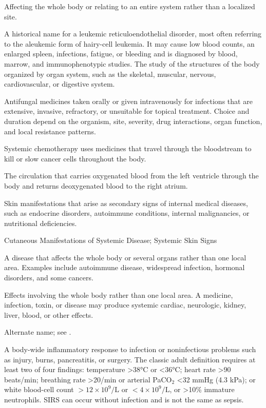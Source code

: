  Affecting the whole body or relating to an entire system rather than a localized site.

 A historical name for a leukemic reticuloendothelial disorder, most often referring to the aleukemic form of hairy-cell leukemia. It may cause low blood counts, an enlarged spleen, infections, fatigue, or bleeding and is diagnosed by blood, marrow, and immunophenotypic studies.
 The study of the structures of the body organized by organ system, such as the skeletal, muscular, nervous, cardiovascular, or digestive system.

 Antifungal medicines taken orally or given intravenously for infections that are extensive,
invasive, refractory, or unsuitable for topical treatment. Choice and duration depend on the
organism, site, severity, drug interactions, organ function, and local resistance patterns.

 Systemic chemotherapy uses medicines that travel through the bloodstream to kill or slow cancer cells throughout the body.

 The circulation that carries oxygenated blood from the left ventricle through the body and returns deoxygenated blood to the right atrium.

 Skin manifestations that arise as secondary signs of internal medical diseases, such as endocrine disorders, autoimmune conditions, internal malignancies, or nutritional deficiencies.

\synonyms
Cutaneous Manifestations of Systemic Disease; Systemic Skin Signs

 A disease that affects the whole body or several organs rather than one local area. Examples include autoimmune disease, widespread infection, hormonal disorders, and some cancers.

 Effects involving the whole body rather than one local area. A medicine, infection, toxin, or disease may produce systemic cardiac, neurologic, kidney, liver, blood, or other effects.

 Alternate name; see .

 A body-wide inflammatory response to infection or
noninfectious problems such as injury, burns, pancreatitis, or surgery. The classic adult definition
requires at least two of four findings: temperature >38°C or <36°C; heart rate >90 beats/min; breathing
rate >20/min or arterial PaCO$_2$ <32 mmHg (4.3 kPa); or white blood-cell count $>12\times10^9/\mathrm{L}$ or
$<4\times10^9/\mathrm{L}$, or >10\% immature neutrophils. SIRS can occur without infection and is not the same
as sepsis.

